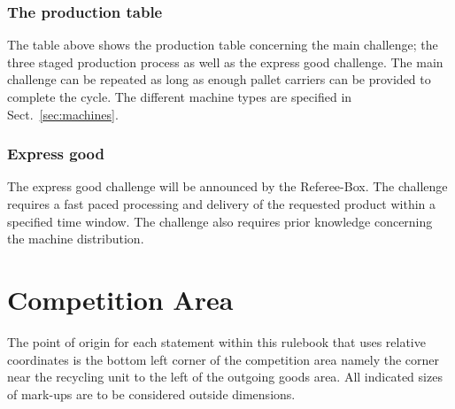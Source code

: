 \documentclass[12pt,twoside]{article}
\begin{document}






\subsubsection{The production table}

The table above shows the production table concerning the main
challenge; the three staged production process as well as the express
good challenge. The main challenge can be repeated as long as enough
pallet carriers can be provided to complete the cycle. The different
machine types are specified in Sect.~\ref{sec:machines}.


\subsubsection{Express good}

The express good challenge will be announced by the Referee-Box. The challenge
requires a fast paced processing and delivery of the requested product within
a specified time window. The challenge also requires prior knowledge
concerning the machine distribution.

\section{Competition Area}

The point of origin for each statement within this rulebook that uses
relative coordinates is the bottom left corner of the competition area
namely the corner near the recycling unit to the left of the outgoing
goods area. All indicated sizes of mark-ups are to be considered
outside dimensions.
\end{document}
